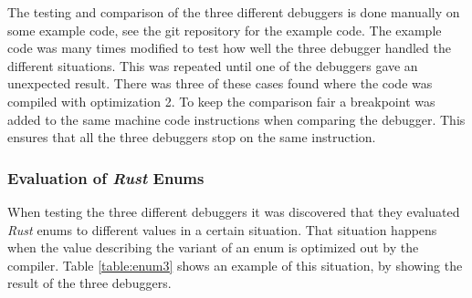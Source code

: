 


The testing and comparison of the three different debuggers is done manually on some example code, see the git repository \cite{example-code} for the example code.
The example code was many times modified to test how well the three debugger handled the different situations.
This was repeated until one of the debuggers gave an unexpected result.
There was three of these cases found where the code was compiled with optimization 2.
To keep the comparison fair a breakpoint was added to the same machine code instructions when comparing the debugger.
This ensures that all the three debuggers stop on the same instruction.


\subsubsection{Evaluation of \emph{Rust} Enums}
When testing the three different debuggers it was discovered that they evaluated \emph{Rust} enums to different values in a certain situation.
That situation happens when the value describing the variant of an enum is optimized out by the compiler.
Table \ref{table:enum3} shows an example of this situation, by showing the result of the three debuggers.


